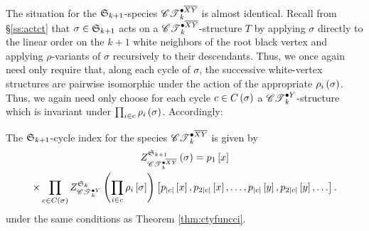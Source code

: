 \documentclass[sectionflow,singlespace,twoside,boldmathhdr,draft]{brandiss} %
\numberwithin{section}{chapter}
\numberwithin{figure}{chapter}
\begin{document}
The situation for the $\symgp{k+1}$-species $\pointed[\overline{XY}]{\specname{CT}}_{k}$ is almost identical.
Recall from \S \ref{ss:actct} that $\sigma \in \symgp{k+1}$ acts on a $\pointed[\overline{XY}]{\specname{CT}}_{k}$-structure $T$ by applying $\sigma$ directly to the linear order on the $k+1$ white neighbors of the root black vertex and applying $\rho$-variants of $\sigma$ recursively to their descendants.
Thus, we once again need only require that, along each cycle of $\sigma$, the successive white-vertex structures are pairwise isomorphic under the action of the appropriate $\rho_{i} \pbrac{\sigma}$.
Thus, we again need only choose for each cycle $c \in C \pbrac{\sigma}$ a $\pointed[Y]{\specname{CT}}_{k}$-structure which is invariant under $\prod_{i \in c} \rho_{i} \pbrac{\sigma}$.
Accordingly:
\begin{theorem}
  \label{thm:ctxyfuncci}
  The $\symgp{k+1}$-cycle index for the species $\pointed[\overline{XY}]{\specname{CT}}_{k}$ is given by
  \begin{multline}
    \label{eq:ctxyfuncci}
    \gci{\symgp{k+1}}{\pointed[\overline{XY}]{\specname{CT}}_{k}} \pbrac{\sigma} = p_{1} \sbrac{x} \\
    \times \prod_{c \in C \pbrac{\sigma}} \gci{\symgp{k}}{\pointed[Y]{\specname{CT}}_{k}} \pbrac{\prod_{i \in c} \rho_{i} \sbrac{\sigma}} \sbrac{p_{\abs{c}} \sbrac{x}, p_{2 \abs{c}} \sbrac{x}, \dots, p_{\abs{c}} \sbrac{y}, p_{2 \abs{c}} \sbrac{y}, \dots}.
  \end{multline}
  under the same conditions as Theorem \ref{thm:ctyfuncci}.
\end{theorem}
\end{document}
